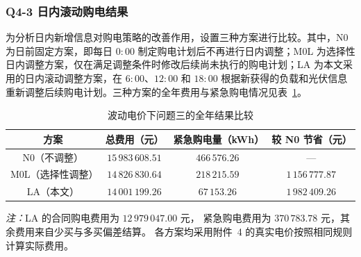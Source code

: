 \subsubsection{Q4-3 日内滚动购电结果}

为分析日内新增信息对购电策略的改善作用，设置三种方案进行比较。其中，N0 为日前固定方案，即每日 $0{:}00$ 制定购电计划后不再进行日内调整；M0L 为选择性日内调整方案，仅在满足调整条件时修改后续尚未执行的购电计划；LA 为本文采用的日内滚动调整方案，在 $6{:}00$、$12{:}00$ 和 $18{:}00$ 根据新获得的负载和光伏信息重新调整后续购电计划。三种方案的全年费用与紧急购电情况见表~\ref{tab:q4_all}。

\begin{table}[!htbp]
  \centering
  \caption{波动电价下问题三的全年结果比较}
  \label{tab:q4_all}
  \begingroup
  \small
  \setlength{\tabcolsep}{5pt}


  \begin{tabular}{cccc}
    \toprule

    \rowcolor{headerblue}
    方案 & 总费用（元） & 紧急购电量（kWh） & 较 N0 节省（元） \\

    \midrule

    N0（不调整）
      & $15\,983\,608.51$
      & $466\,576.26$
      & --- \\

    \rowcolor{rowblue}
    M0L（选择性调整）
      & $14\,826\,830.64$
      & $218\,215.59$
      & $1\,156\,777.87$ \\

    LA（本文）
      & $14\,001\,199.26$
      & $67\,153.26$
      & $1\,982\,409.26$ \\

    \bottomrule
  \end{tabular}

  \par\smallskip

  \begin{minipage}{0.94\textwidth}
    \small\textit{注：}LA 的合同购电费用为 $12\,979\,047.00$ 元，
    紧急购电费用为 $370\,783.78$ 元，其余费用来自少买与多买偏差结算。
    各方案均采用附件~4 的真实电价按照相同规则计算实际费用。
  \end{minipage}

  \endgroup
\end{table}

